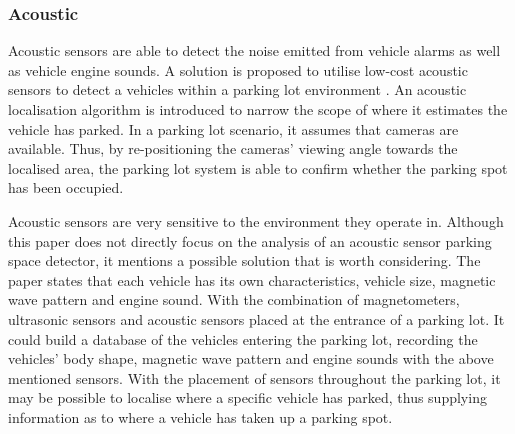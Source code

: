 \subsubsection*{Acoustic}
Acoustic sensors are able to detect the noise emitted from vehicle alarms as well as vehicle engine sounds. A solution is proposed to utilise low-cost acoustic sensors to detect a vehicles within a parking lot environment \citep{Na2009AcousticSystem}. An acoustic localisation algorithm is introduced to narrow the scope of where it estimates the vehicle has parked. In a parking lot scenario, it assumes that cameras are available. Thus, by re-positioning the cameras' viewing angle towards the localised area, the parking lot system is able to confirm whether the parking spot has been occupied.

Acoustic sensors are very sensitive to the environment they operate in. Although this paper \citep{Lee2008IntelligentNetworks} does not directly focus on the analysis of an acoustic sensor parking space detector, it mentions a possible solution that is worth considering. The paper states that each vehicle has its own characteristics, vehicle size, magnetic wave pattern and engine sound. With the combination of magnetometers, ultrasonic sensors and acoustic sensors placed at the entrance of a parking lot. It could build a database of the vehicles entering the parking lot, recording the vehicles' body shape, magnetic wave pattern and engine sounds with the above mentioned sensors. With the placement of sensors throughout the parking lot, it may be possible to localise where a specific vehicle has parked, thus supplying information as to where a vehicle has taken up a parking spot.